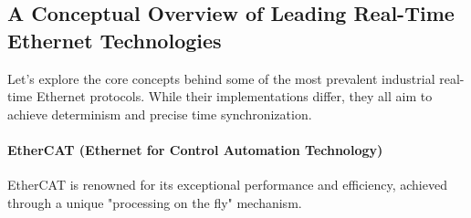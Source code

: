 
\subsection{A Conceptual Overview of Leading Real-Time Ethernet Technologies}
\label{subsec:rt_ethernet_technologies}

Let's explore the core concepts behind some of the most prevalent industrial real-time Ethernet protocols. While their implementations differ, they all aim to achieve determinism and precise time synchronization.

\paragraph{EtherCAT (Ethernet for Control Automation Technology)}
EtherCAT is renowned for its exceptional performance and efficiency, achieved through a unique "processing on the fly" mechanism.
